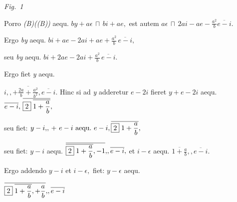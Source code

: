   \vspace{0.5em}
  \centerline{\lbrack\textit{Fig.~1}\rbrack}%
  \label{LH_35_09_23_011r_Fig.1}%
  \newpage%
%
\pstart%
Porro%
%
%
\textit{(B)((B))} aequ.
%
%
$by+a\epsilon\,\sqcap\,bi+ae,$
est autem $a\epsilon\,\sqcap\, 2ai-ae-\displaystyle\frac{a^2}{b}\overline{e-i}.$
\rule[-2mm]{0pt}{7mm}%
Ergo
\textit{by} aequ. $bi+ae-2ai+ae+\displaystyle\frac{a^2}{b}\,\overline{e-i},$
\rule[-2mm]{0pt}{0mm}%
seu
\textit{by} aequ. $bi+2ae-2ai+\displaystyle\frac{a^2}{b}\,\overline{e-i}.$
\rule[-2mm]{0pt}{0mm}%
Ergo fiet
\textit{y} aequ.
\rule[-2mm]{0pt}{7mm}%
%
$i,\!,+ \overline{\displaystyle\frac{2a}{b}+\displaystyle\frac{a^2}{b^2}},\overline{e-i}.$
%
Hinc si ad \textit{y} adderetur $e-2i$
fieret $y+e-2i$ aequ.
$\overline{e-i}, \,\overline{\framebox{2}\;\overline{1+\displaystyle\frac{a}{b}}},$%
\rule[-2mm]{0pt}{7mm}
seu fiet:
$y - i,\!,\, +\ e - i\ \text{aequ.}\
e - i, \overline{\framebox{2}\;1+\displaystyle\frac{a}{b}},$%
\rule[-3mm]{0pt}{9mm}
seu fiet:
$y-i$ aequ.
$\overline{\overline{\framebox{2}\;1+\displaystyle\frac{a}{b}},-1},\!,\overline{e-i},$
et $i-\epsilon$ aequ. $\overline{1+\displaystyle\frac{a}{b}},\!,\overline{e-i}.$%
\rule[-2mm]{0pt}{7mm}%
%
%
Ergo addendo
$y-i$ et $i-\epsilon,$
fiet:
$y-\epsilon$ aequ.
\rule[-2mm]{0pt}{7mm}%
$\overline{\framebox{2}\;\overline{1+\displaystyle\frac{a}{b}},+\displaystyle\frac{a}{b}},\!,\overline{e-i}$%
